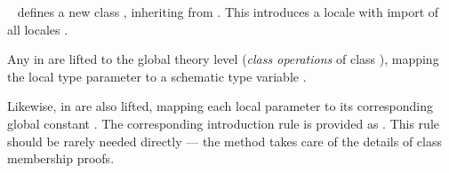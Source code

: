 \begin{isabellebody}
\begin{isamarkuptext}
\begin{description}
  \item \hyperlink{command.class}{\mbox{}}~ defines
  a new class , inheriting from .  This
  introduces a locale  with import of all locales .

  Any \hyperlink{element.fixes}{\mbox{}} in  are lifted to the global
  theory level (\emph{class operations}  of class ), mapping the local type parameter
   to a schematic type variable .

  Likewise, \hyperlink{element.assumes}{\mbox{}} in  are also lifted,
  mapping each local parameter  to its
  corresponding global constant .  The
  corresponding introduction rule is provided as .  This rule should be rarely needed directly
  --- the \hyperlink{method.intro-classes}{\mbox{}} method takes care of the details of
  class membership proofs.


\end{description}
\end{isamarkuptext}
\end{isabellebody}
